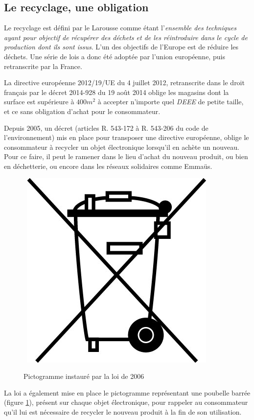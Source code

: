 \subsection{Le recyclage, une obligation}

Le recyclage est défini par le Larousse  comme étant l'\og{}\textit{ensemble des techniques ayant pour objectif de récupérer des déchets et de les réintroduire dans le cycle de production dont ils sont issus}\fg{}. L'un des objectifs de l'Europe est de réduire les déchets. Une série de lois a donc été adoptée par l'union européenne, puis retranscrite par la France. 

La directive européenne 2012/19/UE du 4 juillet 2012, retranscrite dans le droit français par le décret 2014-928 du 19 août 2014 oblige  les magasins dont la surface est supérieure à $400m^2$ à accepter n'importe quel \textit{DEEE} de petite taille, et ce sans obligation d'achat pour le consommateur. 

Depuis 2005, un décret (articles R. 543-172 à R. 543-206 du code de l'environnement) mis en place pour transposer %
 une directive européenne, oblige le consommateur à recycler un objet électronique lorsqu'il en achète un nouveau. Pour ce faire, il peut le ramener dans le lieu d'achat du nouveau produit, ou bien en déchetterie, ou encore dans les réseaux solidaires comme Emmaüs.

\begin{figure}
~\includegraphics[scale=0.33]{Rsc/pictopoubellebarree.jpg} 
\caption{Pictogramme instauré par la loi de 2006}
\label{fig::picPoubelleBarree}
\end{figure} 
La loi a également mise en place le pictogramme représentant une poubelle barrée (figure \ref{fig::picPoubelleBarree}), présent sur chaque objet électronique, pour rappeler au consommateur qu'il lui est nécessaire de recycler le nouveau produit à la fin de son utilisation.

